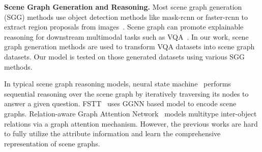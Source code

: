 \documentclass[letterpaper]{article} %
\begin{document}
\vspace{0.05in}
\noindent\textbf{Scene Graph Generation and Reasoning.}
Most scene graph generation (SGG) methods use object detection methods like mask-rcnn or faster-rcnn to extract region proposals from images~\cite{DBLP:conf/cvpr/XuZCF17,DBLP:conf/eccv/YangLLBP18,DBLP:conf/cvpr/ZellersYTC18,DBLP:conf/nips/WooKCK18,DBLP:conf/cvpr/DaiZL17,DBLP:conf/iccv/LiOZWW17,DBLP:conf/eccv/YinSLYWSL18,DBLP:conf/cvpr/TangNHSZ20}. 
Scene graph can promote explainable reasoning for downstream multimodal tasks such as VQA~\cite{DBLP:conf/bmvc/ZhangCX19}. 
In our work, scene graph generation methods are used to transform VQA datasets into scene graph datasets. 
Our model is tested on those generated datasets using various SGG methods.

In typical scene graph reasoning models, neural state machine~\cite{DBLP:conf/nips/HudsonM19} 
performs sequential reasoning over the scene graph by iteratively traversing its nodes to answer a given question.
FSTT~\cite{inproceedings} uses GGNN based model to encode scene graphs.
Relation-aware Graph Attention Network~\cite{DBLP:conf/iccv/LiGCL19} models multitype inter-object relations via a graph attention mechanism.
However, the previous works are hard to fully utilize the attribute information and learn the comprehensive representation of scene graphs.
\end{document}
